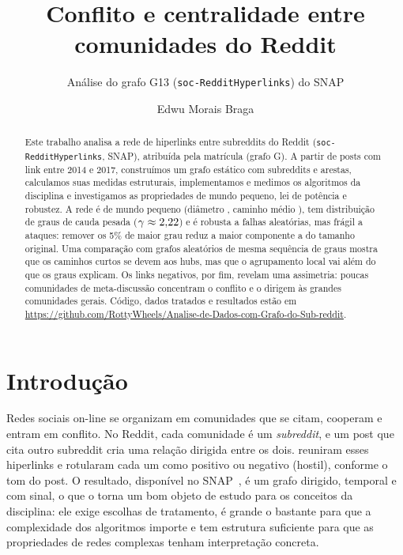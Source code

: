 \IfFileExists{webmedia.cls}{\webmediatrue\documentclass[sigconf]{webmedia}}{\documentclass[sigconf]{acmart}}
\makeatletter
\newcommand{\autorNome}{Edwu Morais Braga}
\newcommand{\autorEmail}{edwubraga@ufba.br}
\newcommand{\repo}{\url{https://github.com/RottyWheels/Analise-de-Dados-com-Grafo-do-Sub-reddit}}
\makeatother
\begin{document}
\title{Conflito e centralidade entre comunidades do Reddit}
\subtitle{Análise do grafo G13 (\texttt{soc-RedditHyperlinks}) do SNAP}

\author{\autorNome}
\email{\autorEmail}
\renewcommand{\shortauthors}{\autorNome}

\begin{abstract}
Este trabalho analisa a rede de hiperlinks entre subreddits do Reddit (\texttt{soc-RedditHyperlinks},
SNAP), atribuída pela matrícula \matricula{} (grafo G\grafoID). A partir de \postsTotal{} posts com link
entre 2014 e 2017, construímos um grafo estático com \nVertices{} subreddits e \nArestas{} arestas,
calculamos suas medidas estruturais, implementamos e medimos os algoritmos da disciplina e investigamos
as propriedades de mundo pequeno, lei de potência e robustez. A rede é de mundo pequeno
(diâmetro \diametro, caminho médio \caminhoMedio), tem distribuição de graus de cauda pesada
($\gamma \approx 2{,}22$) e é robusta a falhas aleatórias, mas frágil a ataques: remover os 5\% de
maior grau reduz a maior componente a \Sgrau{} do tamanho original. Uma comparação com grafos
aleatórios de mesma sequência de graus mostra que os caminhos curtos se devem aos hubs, mas que o
agrupamento local vai além do que os graus explicam. Os links negativos, por fim, revelam uma
assimetria: poucas comunidades de meta-discussão concentram o conflito e o dirigem às grandes
comunidades gerais. Código, dados tratados e resultados estão em \repo.
\end{abstract}


\maketitle

\section{Introdução}
Redes sociais on-line se organizam em comunidades que se citam, cooperam e entram em conflito.
No Reddit, cada comunidade é um \emph{subreddit}, e um post que cita outro subreddit cria uma relação
dirigida entre os dois. \citet{kumar2018} reuniram esses hiperlinks e rotularam cada um como positivo
ou negativo (hostil), conforme o tom do post. O resultado, disponível no SNAP~\cite{snap}, é um grafo
dirigido, temporal e com sinal, o que o torna um bom objeto de estudo para os conceitos da disciplina:
ele exige escolhas de tratamento, é grande o bastante para que a complexidade dos algoritmos importe
e tem estrutura suficiente para que as propriedades de redes complexas tenham interpretação concreta.
\end{document}
